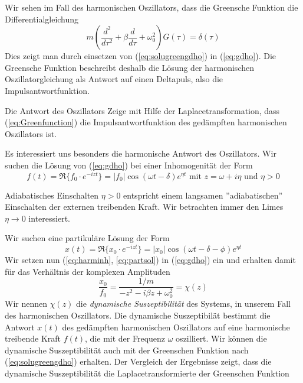 Wir sehen im Fall des harmonischen Oszillators, dass die Greensche Funktion die
Differentialgleichung
\begin{equation}
  m\left(\frac{d^2}{d\tau^2}+\beta\frac{d}{d\tau}+\omega_0^2\right)G(\tau)=\delta(\tau)  
  \label{eq:dglGreensfunction}
\end{equation}
Dies zeigt man durch einsetzen von (\ref{eq:solugreengdho}) in (\ref{eq:gdho}).
Die Greensche Funktion beschreibt deshalb die Lösung der harmonischen
Oszillatorgleichung als Antwort auf einen Deltapuls, also die
Impulsantwortfunktion.
\begin{exercise}{Die Antwort des Oszillators}
Zeige mit Hilfe der Laplacetransformation, dass (\ref{eq:Greenfunction}) die
Impulsantwortfunktion des gedämpften harmonischen Oszillators ist.
\end{exercise}
Es interessiert uns besonders die harmonische Antwort des Oszillators.  Wir
suchen die Lösung von (\ref{eq:gdho}) bei einer Inhomogenität der Form
\begin{equation}\label{eq:harminh}
f(t)=\Re\{f_0\cdot e^{-izt}\}=|f_0| \cos(\omega t-\delta)e^{\eta t}\mbox{ mit }z=\omega
+i\eta\mbox{ und }\eta >0
\end{equation}
\begin{note}{Adiabatisches Einschalten}
$\eta >0$ entspricht einem langsamen ''adiabatischen'' Einschalten der externen
treibenden Kraft. Wir betrachten immer den Limes $\eta\rightarrow 0$
interessiert.
\end{note}
Wir suchen eine partikuläre Lösung der Form
\begin{equation}\label{eq:partsol}
x(t)=\Re\{x_0\cdot e^{-izt}\}=|x_0| \cos(\omega t-\delta-\phi)e^{\eta t}
\end{equation}
Wir setzen nun (\ref{eq:harminh}, \ref{eq:partsol}) in (\ref{eq:gdho}) ein und
erhalten damit für das Verhältnis der komplexen Amplituden
\begin{equation}\label{eq:dynsusz}
\frac{x_0}{f_0}=\frac{1/m}{-z^2-i\beta z+\omega_0^2}=\chi(z)
\end{equation}
Wir nennen $\chi(z)$ die {\it dynamische Suszeptibilität} des Systems, in unserem
Fall des harmonischen Oszillators. Die dynamische Suszeptibilät bestimmt die
Antwort $x(t)$ des gedämpften harmonischen Oszillators auf eine harmonische
treibende Kraft $f(t)$, die mit der Frequenz $\omega$ oszilliert. Wir können
die dynamische Suszeptibilität auch mit der Greenschen Funktion nach
(\ref{eq:solugreengdho}) erhalten. Der Vergleich der Ergebnisse zeigt, dass die
dynamische Suszeptibilität die Laplacetransformierte der Greenschen Funktion
